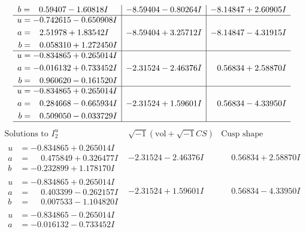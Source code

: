 \documentclass[1p]{elsarticle_modified}
\theoremstyle{definition}
\newcommand{\I}{\sqrt{-1}}
\begin{document}
$$\begin{array}{c|c|c}
\begin{aligned}
b &= \phantom{-}0.59407 - 1.60818 I\end{aligned}
 & -8.59404 - 0.80264 I & -8.14847 + 2.60905 I \\ \hline\begin{aligned}
u &= -0.742615 - 0.650908 I \\
a &= \phantom{-}2.51978 + 1.83542 I \\
b &= \phantom{-}0.058310 + 1.272450 I\end{aligned}
 & -8.59404 + 3.25712 I & -8.14847 - 4.31915 I \\ \hline\begin{aligned}
u &= -0.834865 + 0.265014 I \\
a &= -0.016132 + 0.733452 I \\
b &= \phantom{-}0.960620 - 0.161520 I\end{aligned}
 & -2.31524 - 2.46376 I & \phantom{-}0.56834 + 2.58870 I \\ \hline\begin{aligned}
u &= -0.834865 + 0.265014 I \\
a &= \phantom{-}0.284668 - 0.665934 I \\
b &= \phantom{-}0.509050 - 0.033729 I\end{aligned}
 & -2.31524 + 1.59601 I & \phantom{-}0.56834 - 4.33950 I\\
 \hline 
 \end{array}$$\newpage$$\begin{array}{c|c|c}  
\text{Solutions to }I^u_{2}& \I (\text{vol} + \sqrt{-1}CS) & \text{Cusp shape}\\
 \hline 
\begin{aligned}
u &= -0.834865 + 0.265014 I \\
a &= \phantom{-}0.475849 + 0.326477 I \\
b &= -0.232899 + 1.178170 I\end{aligned}
 & -2.31524 - 2.46376 I & \phantom{-}0.56834 + 2.58870 I \\ \hline\begin{aligned}
u &= -0.834865 + 0.265014 I \\
a &= \phantom{-}0.403399 - 0.262157 I \\
b &= \phantom{-}0.007533 - 1.104820 I\end{aligned}
 & -2.31524 + 1.59601 I & \phantom{-}0.56834 - 4.33950 I \\ \hline\begin{aligned}
u &= -0.834865 - 0.265014 I \\
a &= -0.016132 - 0.733452 I \\

\end{aligned}
\end{array}$$
\end{document}
